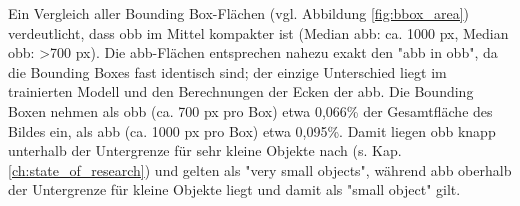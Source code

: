 Ein Vergleich aller Bounding Box-Flächen (vgl. Abbildung \ref{fig:bbox_area}) verdeutlicht, dass \acrshort{obb} im Mittel kompakter ist (Median \acrshort{abb}: ca. 1000 px, Median \acrshort{obb}: >700 px). Die \acrshort{abb}-Flächen entsprechen nahezu exakt den "abb in obb", da die Bounding Boxes fast identisch sind; der einzige Unterschied liegt im trainierten Modell und den Berechnungen der Ecken der \acrshort{abb}. Die Bounding Boxen nehmen  als \acrshort{obb} (ca. 700 px pro Box) etwa 0,066\% der Gesamtfläche des Bildes ein, als \acrshort{abb} (ca. 1000 px pro Box) etwa 0,095\%. Damit liegen \acrshort{obb} knapp unterhalb der Untergrenze für sehr kleine Objekte nach \citeauthor{Chen2017} \cite{Chen2017} (s. Kap. \ref{ch:state_of_research}) und gelten als "very small objects", während \acrshort{abb} oberhalb der Untergrenze für kleine Objekte liegt und damit als "small object" gilt.



